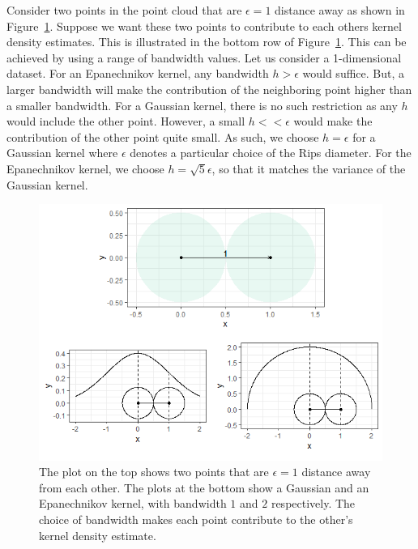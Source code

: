 \documentclass[letter,12pt]{article}
\begin{document}
Consider two points in the point cloud that are $\epsilon = 1$ distance away as shown in Figure~\ref{fig:epsilonandkernels}. Suppose we want these two points to contribute to each others kernel density estimates. This is illustrated in the bottom row of Figure~\ref{fig:epsilonandkernels}. This can be achieved by using a range of bandwidth values. Let us consider a 1-dimensional dataset. For an Epanechnikov kernel, any bandwidth $h > \epsilon $ would suffice. But, a larger bandwidth will make the contribution of the neighboring point higher than a smaller bandwidth. For a Gaussian kernel, there is no such restriction as any $h$ would include the other point. However, a small $h < < \epsilon$ would make the contribution of the other point quite small. As such, we choose $h=\epsilon$ for a Gaussian kernel where $\epsilon$ denotes a particular choice of the Rips diameter. For the Epanechnikov kernel, we choose $h = \sqrt{5} \epsilon$, so that it matches the variance of the Gaussian kernel.  

\begin{figure}[!ht]
    \centering
    \includegraphics[scale=0.8]{Graphics/circles_and_kernels.png}
    \caption{The plot on the top shows two points that are  $\epsilon = 1$ distance away from each other. The plots at the bottom show a Gaussian and an Epanechnikov kernel, with bandwidth $1$ and $2$ respectively. The choice of bandwidth makes each point contribute to the other's kernel density estimate. }
    \label{fig:epsilonandkernels}
\end{figure}
\end{document}
